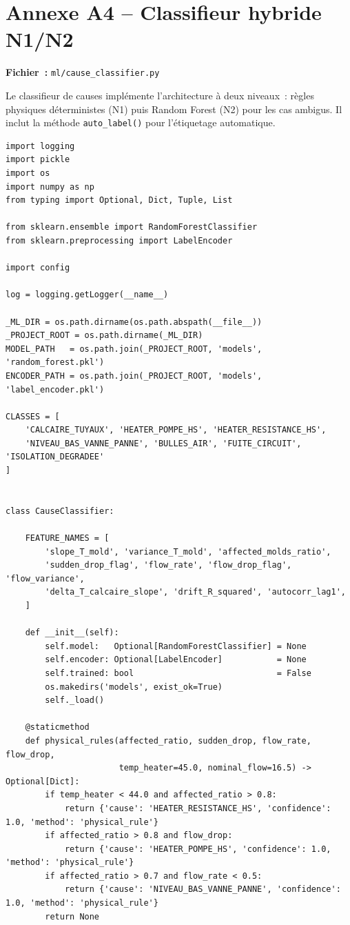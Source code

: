 \section{Annexe A4 -- Classifieur hybride N1/N2}
\label{annexe:classifier}

\textbf{Fichier~:} \texttt{ml/cause\_classifier.py}

Le classifieur de causes implémente l'architecture à deux niveaux~: règles physiques déterministes (N1) puis Random Forest (N2) pour les cas ambigus. Il inclut la méthode \texttt{auto\_label()} pour l'étiquetage automatique.

\begin{lstlisting}
import logging
import pickle
import os
import numpy as np
from typing import Optional, Dict, Tuple, List

from sklearn.ensemble import RandomForestClassifier
from sklearn.preprocessing import LabelEncoder

import config

log = logging.getLogger(__name__)

_ML_DIR = os.path.dirname(os.path.abspath(__file__))
_PROJECT_ROOT = os.path.dirname(_ML_DIR)
MODEL_PATH   = os.path.join(_PROJECT_ROOT, 'models', 'random_forest.pkl')
ENCODER_PATH = os.path.join(_PROJECT_ROOT, 'models', 'label_encoder.pkl')

CLASSES = [
    'CALCAIRE_TUYAUX', 'HEATER_POMPE_HS', 'HEATER_RESISTANCE_HS',
    'NIVEAU_BAS_VANNE_PANNE', 'BULLES_AIR', 'FUITE_CIRCUIT', 'ISOLATION_DEGRADEE'
]


class CauseClassifier:

    FEATURE_NAMES = [
        'slope_T_mold', 'variance_T_mold', 'affected_molds_ratio',
        'sudden_drop_flag', 'flow_rate', 'flow_drop_flag', 'flow_variance',
        'delta_T_calcaire_slope', 'drift_R_squared', 'autocorr_lag1',
    ]

    def __init__(self):
        self.model:   Optional[RandomForestClassifier] = None
        self.encoder: Optional[LabelEncoder]           = None
        self.trained: bool                             = False
        os.makedirs('models', exist_ok=True)
        self._load()

    @staticmethod
    def physical_rules(affected_ratio, sudden_drop, flow_rate, flow_drop,
                       temp_heater=45.0, nominal_flow=16.5) -> Optional[Dict]:
        if temp_heater < 44.0 and affected_ratio > 0.8:
            return {'cause': 'HEATER_RESISTANCE_HS', 'confidence': 1.0, 'method': 'physical_rule'}
        if affected_ratio > 0.8 and flow_drop:
            return {'cause': 'HEATER_POMPE_HS', 'confidence': 1.0, 'method': 'physical_rule'}
        if affected_ratio > 0.7 and flow_rate < 0.5:
            return {'cause': 'NIVEAU_BAS_VANNE_PANNE', 'confidence': 1.0, 'method': 'physical_rule'}
        return None


\end{lstlisting}
